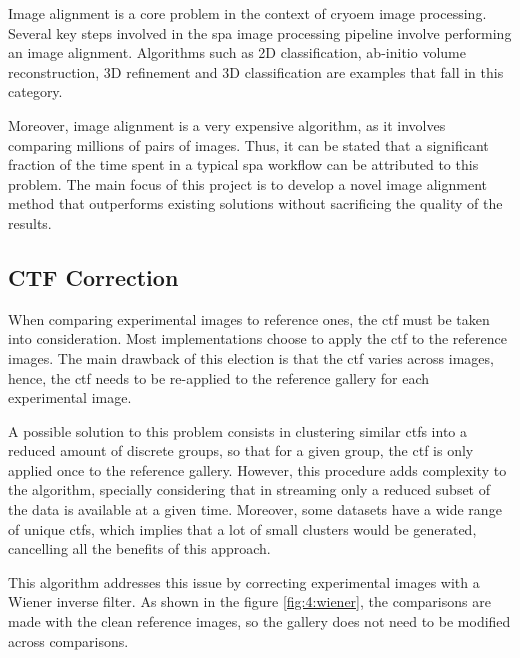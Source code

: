 \documentclass[../main.tex]{subfiles}
\begin{document}
Image alignment is a core problem in the context of \gls{cryoem} image processing. Several key steps involved in the \gls{spa} image processing pipeline involve performing an image alignment. Algorithms such as 2D classification, ab-initio volume reconstruction, 3D refinement and 3D classification are examples that fall in this category.

Moreover, image alignment is a very expensive algorithm, as it involves comparing millions of pairs of images. Thus, it can be stated that a significant fraction of the time spent in a typical \gls{spa} workflow can be attributed to this problem. The main focus of this project is to develop a novel image alignment method that outperforms existing solutions without sacrificing the quality of the results.



\subsection{CTF Correction}
When comparing experimental images to reference ones, the \gls{ctf} must be taken into consideration. Most implementations choose to apply the \gls{ctf} to the reference images. The main drawback of this election is that the \gls{ctf} varies across images, hence, the \gls{ctf} needs to be re-applied to the reference gallery for each experimental image\cite{scheres2005}.

A possible solution to this problem consists in clustering similar \glspl{ctf} into a reduced amount of discrete groups, so that for a given group, the \gls{ctf} is only applied once to the reference gallery. However, this procedure adds complexity to the algorithm, specially considering that in streaming only a reduced subset of the data is available at a given time. Moreover, some datasets have a wide range of unique \glspl{ctf}, which implies that a lot of small clusters would be generated, cancelling all the benefits of this approach.

This algorithm addresses this issue by correcting experimental images with a Wiener inverse filter. As shown in the figure \ref{fig:4:wiener}, the comparisons are made with the clean reference images, so the gallery does not need to be modified across comparisons.
\end{document}
